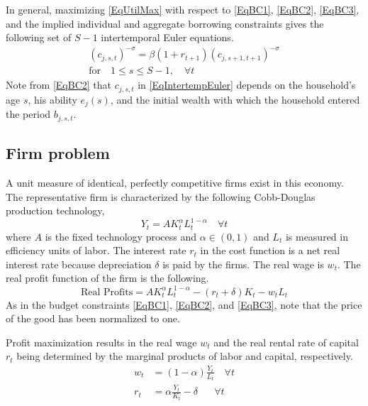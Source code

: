 \documentclass[letterpaper,12pt]{article}
\theoremstyle{definition}
\begin{document}
\begin{spacing}{1.5}
    In general, maximizing \eqref{EqUtilMax} with respect to \eqref{EqBC1}, \eqref{EqBC2}, \eqref{EqBC3}, and the implied individual and aggregate borrowing constraints gives the following set of $S-1$ intertemporal Euler equations.
    \begin{equation}\label{EqIntertempEuler}
      \begin{split}
        \left(c_{j,s,t}\right)^{-\sigma} = \beta \left(1+r_{t+1}\right)\left(c_{j,s+1,t+1}\right)^{-\sigma} \\
        \text{for} \quad 1\leq s\leq S-1, \quad \forall t
      \end{split}
    \end{equation}
    Note from \eqref{EqBC2} that $c_{j,s,t}$ in \eqref{EqIntertempEuler} depends on the household's age $s$, his ability $e_j(s)$, and the initial wealth with which the household entered the period $b_{j,s,t}$.


  \subsection{Firm problem}\label{SecModelGenFirm}

    A unit measure of identical, perfectly competitive firms exist in this economy. The representative firm is characterized by the following Cobb-Douglas production technology,
    \begin{equation}\label{EqCobbDougProd}
       Y_t = A K_t^\alpha L_t^{1-\alpha} \quad \forall t
    \end{equation}
    where $A$ is the fixed technology process and $\alpha\in(0,1)$ and $L_t$ is measured in efficiency units of labor. The interest rate $r_t$ in the cost function is a net real interest rate because depreciation $\delta$ is paid by the firms. The real wage is $w_t$. The real profit function of the firm is the following.
    \begin{equation}\label{EqFirmProfit}
       \text{Real Profits} = A K_t^\alpha L_t^{1-\alpha} - (r_t + \delta)K_t - w_t L_t
    \end{equation}
    As in the budget constraints \eqref{EqBC1}, \eqref{EqBC2}, and \eqref{EqBC3}, note that the price of the good has been normalized to one.

    Profit maximization results in the real wage $w_t$ and the real rental rate of capital $r_t$ being determined by the marginal products of labor and capital, respectively.
    \begin{align}
       w_t &= (1-\alpha)\frac{Y_t}{L_t} \quad \forall t \label{EqFOCwage}\\
       r_t &= \alpha\frac{Y_t}{K_t} - \delta \quad\:\:\: \forall t \label{EqFOCrate}
    \end{align}



\end{spacing}
\end{document}
